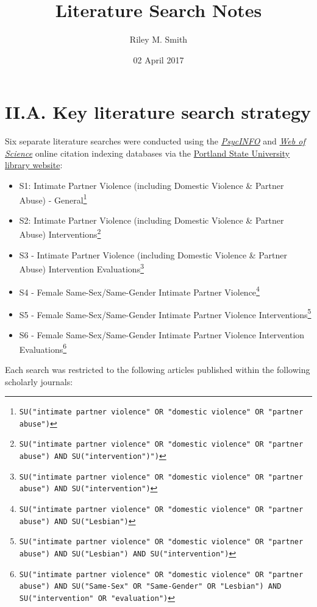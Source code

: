 \documentclass[]{tufte-handout}
\title{Literature Search Notes}
\author{Riley M. Smith}
\date{02 April 2017}
\providecommand{\tightlist}{%
  \setlength{\itemsep}{0pt}\setlength{\parskip}{0pt}}
\begin{document}
\maketitle




\section{II.A. Key literature search
strategy}\label{ii.a.-key-literature-search-strategy}

Six separate literature searches were conducted using the
\href{http://www.apa.org/pubs/databases/psycinfo/}{\emph{PsycINFO}} and
\href{http://wokinfo.com}{\emph{Web of Science}} online citation
indexing databases via the \href{library.pdx.edu}{Portland State
University library website}:

\begin{itemize}
\tightlist
\item
  S1: Intimate Partner Violence (including Domestic Violence \& Partner
  Abuse) - General\footnote{\texttt{SU("intimate partner violence" OR "domestic violence" OR "partner abuse")}}
\item
  S2: Intimate Partner Violence (including Domestic Violence \& Partner
  Abuse) Interventions\footnote{\texttt{SU("intimate partner violence" OR "domestic violence" OR "partner abuse") AND SU("intervention")")}}
\item
  S3 - Intimate Partner Violence (including Domestic Violence \& Partner
  Abuse) Intervention Evaluations\footnote{\texttt{SU("intimate partner violence" OR "domestic violence" OR "partner abuse") AND SU("intervention")}}
\item
  S4 - Female Same-Sex/Same-Gender Intimate Partner Violence\footnote{\texttt{SU("intimate partner violence" OR "domestic violence" OR "partner abuse") AND SU("Lesbian")}}
\item
  S5 - Female Same-Sex/Same-Gender Intimate Partner Violence
  Interventions\footnote{\texttt{SU("intimate partner violence" OR "domestic violence" OR "partner abuse") AND SU("Lesbian") AND SU("intervention")}}
\item
  S6 - Female Same-Sex/Same-Gender Intimate Partner Violence
  Intervention Evaluations\footnote{\texttt{SU("intimate partner violence" OR "domestic violence" OR "partner abuse") AND SU("Same-Sex" OR "Same-Gender" OR "Lesbian") AND SU("intervention" OR "evaluation")}}
\end{itemize}

Each search was restricted to the following articles published within
the following scholarly journals:
\end{document}
